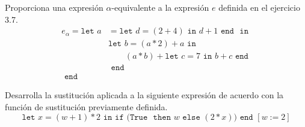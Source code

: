     \begin{exercise}
        Proporciona una expresión $\alpha$-equivalente a la expresión $e$ definida en el ejercicio 3.7.
        \begin{align*}
        	e_\alpha = \texttt{let  }
        		a&= \texttt{let }d = (2 + 4) \texttt{ in } d+1 \texttt{ end }
        		\texttt{ in }\\
        		 &\texttt{let }b=(a \ast 2)+a 
        		 	\texttt{ in } \\
        		 & \qquad(a\ast b) + \texttt{let }c=7 \texttt{ in } 
        		 						b+c 
        		 				\texttt{ end }\\
        		 &\texttt{ end }\\
        	\texttt{ end }&
        \end{align*}
    \end{exercise}

	\newpage

    \begin{exercise}
        Desarrolla la sustitución aplicada a la siguiente expresión de acuerdo con la función de sustitución previamente definida.
        \[
            \texttt{let } x = (w + 1) * 2 \texttt{ in} \texttt{ if (} \texttt{True } \texttt{ then } w \texttt{ else } (2 * x) \texttt{)} \texttt{ end }[w:=2]
        \]
\end{exercise}

